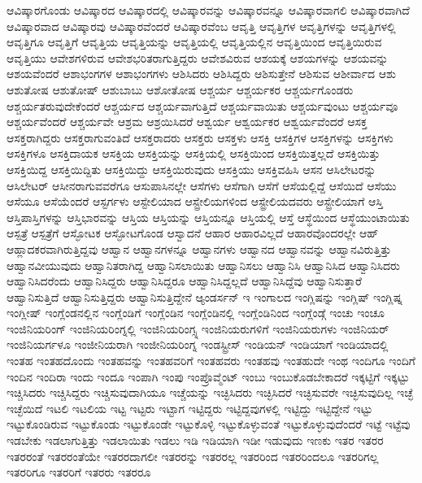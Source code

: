 {ಆವಿಷ್ಕಾರಗೊಂಡು
ಆವಿಷ್ಕಾರದ
ಆವಿಷ್ಕಾರದಲ್ಲಿ
ಆವಿಷ್ಕಾರವನ್ನು
ಆವಿಷ್ಕಾರವನ್ನೂ
ಆವಿಷ್ಕಾರವಾಗಲಿ
ಆವಿಷ್ಕಾರವಾಗಿದೆ
ಆವಿಷ್ಕಾರವಾದ
ಆವಿಷ್ಕಾರವು
ಆವಿಷ್ಕಾರವೆಂದರೆ
ಆವಿಷ್ಕಾರವೆಂಬ
ಆವೃತ್ತಿ
ಆವೃತ್ತಿಗಳ
ಆವೃತ್ತಿಗಳನ್ನು
ಆವೃತ್ತಿಗಳಲ್ಲಿ
ಆವೃತ್ತಿಗೂ
ಆವೃತ್ತಿಗೆ
ಆವೃತ್ತಿಯ
ಆವೃತ್ತಿಯನ್ನು
ಆವೃತ್ತಿಯಲ್ಲಿ
ಆವೃತ್ತಿಯಲ್ಲಿನ
ಆವೃತ್ತಿಯಿಂದ
ಆವೃತ್ತಿಯಿರುವ
ಆವೃತ್ತಿಯು
ಆವೇಶಗಳಿರುವ
ಆವೇಶಭರಿತರಾಗುತ್ತಿದ್ದರು
ಆವೇಶವಿರುವ
ಆಶಯಕ್ಕೆ
ಆಶಯಗಳನ್ನು
ಆಶಯವನ್ನು
ಆಶಯವೆಂದರೆ
ಆಶಾಭಂಗಗಳ
ಆಶಾಭಂಗಗಳು
ಆಶಿಸಿದರು
ಆಶಿಸಿದ್ದರು
ಆಶಿಸುತ್ತೇನೆ
ಆಶಿಸುವ
ಆಶೀರ್ವಾದ
ಆಶು
ಆಶುತೋಷ
ಆಶುತೋಷ್
ಆಶುಬಾಬು
ಆಶೋತೋಷ
ಆಶ್ಚರ್ಯ
ಆಶ್ಚರ್ಯಕರ
ಆಶ್ಚರ್ಯಗೊಂಡರು
ಆಶ್ಚರ್ಯತರುವುದೇಕೆಂದರೆ
ಆಶ್ಚರ್ಯದ
ಆಶ್ಚರ್ಯವಾಗುತ್ತಿದೆ
ಆಶ್ಚರ್ಯವಾಯಿತು
ಆಶ್ಚರ್ಯವುಂಟು
ಆಶ್ಚರ್ಯವೂ
ಆಶ್ಚರ್ಯವೆಂದರೆ
ಆಶ್ಚರ್ಯವೇ
ಆಶ್ರಮ
ಆಶ್ರಯಿಸಿದರೆ
ಆಶ್ವರ್ಯ
ಆಶ್ವರ್ಯಕರ
ಆಶ್ವರ್ಯವೆಂದರೆ
ಆಸಕ್ತ
ಆಸಕ್ತರಾಗಿದ್ದರು
ಆಸಕ್ತರಾಗುವಂತಿದೆ
ಆಸಕ್ತರಾದರು
ಆಸಕ್ತರು
ಆಸಕ್ತಳು
ಆಸಕ್ತಿ
ಆಸಕ್ತಿಗಳ
ಆಸಕ್ತಿಗಳನ್ನು
ಆಸಕ್ತಿಗಳು
ಆಸಕ್ತಿಗಳೂ
ಆಸಕ್ತಿದಾಯಕ
ಆಸಕ್ತಿಯ
ಆಸಕ್ತಿಯನ್ನು
ಆಸಕ್ತಿಯಲ್ಲಿ
ಆಸಕ್ತಿಯಿಂದ
ಆಸಕ್ತಿಯಿತ್ತಲ್ಲದೆ
ಆಸಕ್ತಿಯಿತ್ತು
ಆಸಕ್ತಿಯಿದ್ದ
ಆಸಕ್ತಿಯಿದ್ದಿತು
ಆಸಕ್ತಿಯಿದ್ದು
ಆಸಕ್ತಿಯಿರುವುದು
ಆಸಕ್ತಿಯು
ಆಸಕ್ತಿವಹಿಸಿ
ಆಸನ
ಆಸಿಲೇಟರನ್ನು
ಆಸಿಲೇಟರ್
ಆಸೀನರಾಗುವವರೆಗೂ
ಆಸುಪಾಸಿನಲ್ಲೇ
ಆಸೆಗಳು
ಆಸೆಗಾಗಿ
ಆಸೆಗೆ
ಆಸೆಯಲ್ಲಿದ್ದೆ
ಆಸೆಯಿದೆ
ಆಸೆಯು
ಆಸೆಯೂ
ಆಸೆಯೆಂದರೆ
ಆಸ್ಟರ್ಗಳು
ಆಸ್ಟೇಲಿಯಾದ
ಆಸ್ಟ್ರೇಲಿಯಗಳಿಂದ
ಆಸ್ಟ್ರೇಲಿಯದವರು
ಆಸ್ಟ್ರೇಲಿಯಾಗೆ
ಆಸ್ತಿ
ಆಸ್ತಿಪಾಸ್ತಿಗಳನ್ನು
ಆಸ್ತಿಭಾರವನ್ನು
ಆಸ್ತಿಯ
ಆಸ್ತಿಯನ್ನು
ಆಸ್ತಿಯನ್ನೂ
ಆಸ್ತಿಯಲ್ಲಿ
ಆಸ್ತೆ
ಆಸ್ಥೆಯಿಂದ
ಆಸ್ಥೆಯುಂಟಾಯಿತು
ಆಸ್ಪತ್ರೆ
ಆಸ್ಪತ್ರೆಗೆ
ಆಸ್ಫೋಟಕ
ಆಸ್ಫೋಟಗೊಂಡ
ಆಸ್ವಾದನೆ
ಆಹಾರ
ಆಹಾರವಿಲ್ಲದೆ
ಆಹಾರವೊಂದರಲ್ಲೇ
ಆಹ್
ಆಹ್ಲಾದಕರವಾಗಿರುತ್ತಿದ್ದವು
ಆಹ್ವಾನ
ಆಹ್ವಾನಗಳನ್ನೂ
ಆಹ್ವಾನಗಳು
ಆಹ್ವಾನದ
ಆಹ್ವಾನವನ್ನು
ಆಹ್ವಾನವಿರುತ್ತಿತ್ತು
ಆಹ್ವಾನವೀಯುವುದು
ಆಹ್ವಾನಿತರಾಗಿದ್ದ
ಆಹ್ವಾನಿಸಲಾಯಿತು
ಆಹ್ವಾನಿಸಲು
ಆಹ್ವಾನಿಸಿ
ಆಹ್ವಾನಿಸಿದ
ಆಹ್ವಾನಿಸಿದರು
ಆಹ್ವಾನಿಸಿದರೆಂದು
ಆಹ್ವಾನಿಸಿದ್ದರು
ಆಹ್ವಾನಿಸಿದ್ದರೂ
ಆಹ್ವಾನಿಸಿದ್ದಲ್ಲದೆ
ಆಹ್ವಾನಿಸಿದ್ದೆವು
ಆಹ್ವಾನಿಸುತ್ತಾರೆ
ಆಹ್ವಾನಿಸುತ್ತಿದೆ
ಆಹ್ವಾನಿಸುತ್ತಿದ್ದರು
ಆಹ್ವಾನಿಸುತ್ತಿದ್ದೇನೆ
ಆ್ಯಂಡರ್ಸನ್
ಇ
ಇಂಗಾಲದ
ಇಂಗ್ಲಿಷನ್ನು
ಇಂಗ್ಲಿಷ್
ಇಂಗ್ಲಿಷ್ನ
ಇಂಗ್ಲೀಷ್
ಇಂಗ್ಲೆಂಡನಲ್ಲಿನ
ಇಂಗ್ಲೆಂಡಿಗೆ
ಇಂಗ್ಲೆಂಡಿನ
ಇಂಗ್ಲೆಂಡಿನಲ್ಲಿ
ಇಂಗ್ಲೆಂಡಿನಿಂದ
ಇಂಗ್ಲೆಂಡ್ಗೆ
ಇಂಚು
ಇಂಚೂ
ಇಂಜಿನಿಯರಿಂಗ್
ಇಂಜಿನಿಯರಿಂಗ್ನಲ್ಲಿ
ಇಂಜಿನಿಯರಿಂಗ್ಸ್ನ
ಇಂಜಿನಿಯರುಗಳಿಗೆ
ಇಂಜಿನಿಯರುಗಳು
ಇಂಜಿನಿಯರ್
ಇಂಜಿನಿಯರ್ಗಳೂ
ಇಂಜೀನಿಯರಾಗಿ
ಇಂಜೀನಿಯರಿಂಗ್ನ
ಇಂಡಸ್ಟ್ರೀಸ್
ಇಂಡಿಯನ್
ಇಂಡಿಯಾಗೆ
ಇಂಡಿಯಾದಲ್ಲಿ
ಇಂತಹ
ಇಂತಹದೊಂದು
ಇಂತಹವನ್ನು
ಇಂತಹವರಿಗೆ
ಇಂತಹವರು
ಇಂತಹವು
ಇಂತಹುದೇ
ಇಂಥ
ಇಂದಿಗೂ
ಇಂದಿಗೆ
ಇಂದಿನ
ಇಂದಿರಾ
ಇಂದು
ಇಂದೂ
ಇಂಪಾಗಿ
ಇಂಪು
ಇಂಪ್ರೊವ್ಮೆಂಟ್
ಇಂಬು
ಇಂಬುಕೊಡಬೇಕಾದರೆ
ಇಕ್ಕಟ್ಟಿಗೆ
ಇಕ್ಕಟ್ಟು
ಇಚ್ಚಿಸಿದರು
ಇಚ್ಚಿಸಿದ್ದರು
ಇಚ್ಚಿಸುವುದಾಗಿಯೂ
ಇಚ್ಚೆಯನ್ನು
ಇಚ್ಛಿಸಿದರು
ಇಚ್ಛಿಸಿದರೆ
ಇಚ್ಛಿಸುವರೇ
ಇಚ್ಛಿಸುವುದಿಲ್ಲ
ಇಚ್ಛೆ
ಇಚ್ಛೆಯಿದೆ
ಇಟಲಿ
ಇಟಲಿಯ
ಇಟ್ಟ
ಇಟ್ಟರು
ಇಟ್ಟಾಗ
ಇಟ್ಟಿದ್ದರು
ಇಟ್ಟಿದ್ದವುಗಳಲ್ಲಿ
ಇಟ್ಟಿದ್ದು
ಇಟ್ಟಿದ್ದೇನೆ
ಇಟ್ಟು
ಇಟ್ಟುಕೊಂಡಿರುವ
ಇಟ್ಟುಕೊಂಡು
ಇಟ್ಟುಕೊಂಡೇ
ಇಟ್ಟುಕೊಳ್ಳಿ
ಇಟ್ಟುಕೊಳ್ಳುವಂತೆ
ಇಟ್ಟುಕೊಳ್ಳುವುದೆಂದರೆ
ಇಟ್ಟೆ
ಇಟ್ಟೆವು
ಇಡಬೇಕು
ಇಡಲಾಗುತ್ತಿತ್ತು
ಇಡಲಾಯಿತು
ಇಡಲು
ಇಡಿ
ಇಡಿಯಾಗಿ
ಇಡೀ
ಇಡುವುದು
ಇಣಕು
ಇತರ
ಇತರರ
ಇತರರಂತೆ
ಇತರರಂತೆಯೇ
ಇತರರದಾಗಲೀ
ಇತರರನ್ನು
ಇತರರಲ್ಲ
ಇತರರಿಂದ
ಇತರರಿಂದಲೂ
ಇತರರಿಗಲ್ಲ
ಇತರರಿಗೂ
ಇತರರಿಗೆ
ಇತರರು
ಇತರರೂ
}
